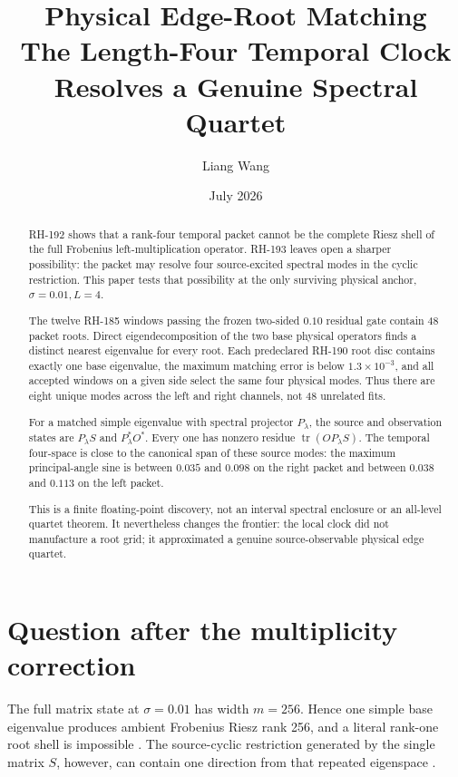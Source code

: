 \documentclass[12pt]{article}
\title{Physical Edge-Root Matching\\
\large The Length-Four Temporal Clock Resolves a Genuine Spectral Quartet}
\author{Liang Wang}
\date{July 2026}
\theoremstyle{remark}
\begin{document}
\maketitle

\begin{abstract}
RH-192 shows that a rank-four temporal packet cannot be the complete Riesz
shell of the full Frobenius left-multiplication operator.  RH-193 leaves open
a sharper possibility: the packet may resolve four source-excited spectral
modes in the cyclic restriction.  This paper tests that possibility at the
only surviving physical anchor, $\sigma=0.01,L=4$.

The twelve RH-185 windows passing the frozen two-sided $0.10$ residual gate
contain 48 packet roots.  Direct eigendecomposition of the two base physical
operators finds a distinct nearest eigenvalue for every root.  Each
predeclared RH-190 root disc contains exactly one base eigenvalue, the
maximum matching error is below $1.3\times10^{-3}$, and all accepted windows
on a given side select the same four physical modes.  Thus there are eight
unique modes across the left and right channels, not 48 unrelated fits.

For a matched simple eigenvalue with spectral projector $P_\lambda$, the
source and observation states are $P_\lambda S$ and
$P_\lambda^*O^*$.  Every one has nonzero residue
$\operatorname{tr}(OP_\lambda S)$.  The temporal four-space is close to the
canonical span of these source modes: the maximum principal-angle sine is
between $0.035$ and $0.098$ on the right packet and between $0.038$ and
$0.113$ on the left packet.

This is a finite floating-point discovery, not an interval spectral
enclosure or an all-level quartet theorem.  It nevertheless changes the
frontier: the local clock did not manufacture a root grid; it approximated a
genuine source-observable physical edge quartet.
\end{abstract}

\section{Question after the multiplicity correction}

The full matrix state at $\sigma=0.01$ has width $m=256$.  Hence one simple
base eigenvalue produces ambient Frobenius Riesz rank 256, and a literal
rank-one root shell is impossible \citep{WangRH192}.  The source-cyclic
restriction generated by the single matrix $S$, however, can contain one
direction from that repeated eigenspace \citep{WangRH193}.
\end{document}
